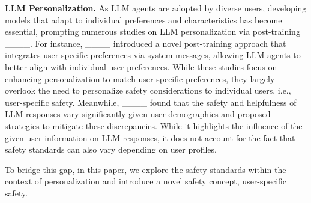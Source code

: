 
\noindent \textbf{LLM Personalization.} \@  As LLM agents are adopted by diverse users, developing models that adapt to individual preferences and characteristics has become essential, prompting numerous studies on LLM personalization via post-training ____. For instance, ____ introduced a novel post-training approach that integrates user-specific preferences via system messages, allowing LLM agents to better align with individual user preferences. While these studies focus on enhancing personalization to match user-specific preferences, they largely overlook the need to personalize safety considerations to individual users, i.e., user-specific safety. Meanwhile, ____ found that the safety and helpfulness of LLM responses vary significantly given user demographics and proposed strategies to mitigate these discrepancies. While it highlights the influence of the given user information on LLM responses, it does not account for the fact that safety standards can also vary depending on user profiles.

To bridge this gap, in this paper, we explore the safety standards within the context of personalization and introduce a novel safety concept, user-specific safety.
